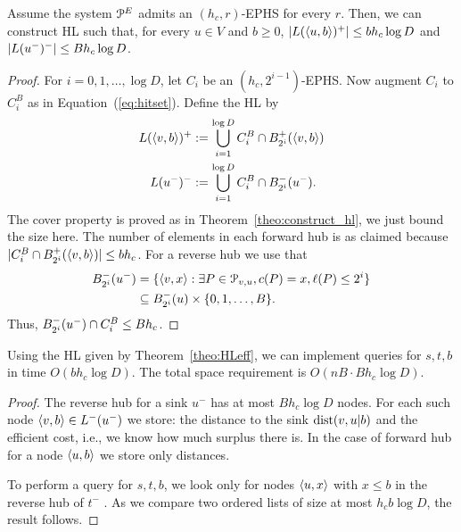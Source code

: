 \begin{theorem}\label{theo:HLeff}
Assume the system $\mathcal{P}^E$ admits an $(h_c,r)$-EPHS for every $r$.
Then, we can construct HL such that, for every $u\in V$ and $b\geq 0$, $\lvert L(\langle u,b\rangle)^+\rvert\leq bh_c\log D$ and $\lvert L(u^-)^-\rvert\leq Bh_c\log D$. 
\end{theorem}
\begin{proof}
For $i=0,1,\ldots,\log D$, let $C_i$ be an $(h_c,2^{i-1})$-EPHS.
Now augment $C_i$ to $C_i^B$ as in Equation~(\ref{eq:hitset}).
Define the HL by
\begin{align*}
L(\langle v,b\rangle)^+ &:= \bigcup_{i=1}^{\log D} C_i^B\cap B^+_{2^i}(\langle v,b\rangle)\\
L(u^-)^-  &:= \bigcup_{i=1}^{\log D} C_i^B\cap B^-_{2^i}(u^-).
\end{align*}
The cover property is proved as in Theorem~\ref{theo:construct_hl}, we just bound the size here.
The number of elements in each forward hub is as claimed because $ \lvert C_i^B\cap B^+_{2^i}(\langle v,b\rangle)\rvert\leq bh_c$.
For a reverse hub we use that
\begin{align*}
B^-_{2^i}(u^-) &= \{\langle v,x\rangle: \exists P\in \mathcal{P}_{v,u}, c(P)=x, \ell(P)\leq 2^i\}\\
&\subseteq B^-_{2^i}(u)\times \{0,1,\ldots,B\}.
\end{align*}
Thus, $B^-_{2^i}(u^-)\cap C_i^B\leq Bh_c$.
\end{proof}


\begin{proposition}
Using the HL given by Theorem~\ref{theo:HLeff}, we can implement queries for $s,t,b$ in time $O(b h_c\log D)$.
The total space requirement is $O(nB \cdot Bh_c\log D)$.
\end{proposition}
\begin{proof}
The reverse hub for a sink $u^-$ has at most $Bh_c\log D$ nodes.
For each such node $\langle v,b\rangle\in L^-(u^-)$ we store: the distance to the sink $\text{dist}(v,u|b)$ and the efficient cost, i.e., we know how much surplus there is.
In the case of forward hub for a node $\langle u,b\rangle$ we store only distances.

To perform a query for $s,t,b$, we look only for nodes $\langle u,x\rangle$ with $x\leq b$ in the reverse hub of $t^-$ .
As we compare two ordered lists of size at most $h_cb\log D$, the result follows.
\end{proof}
